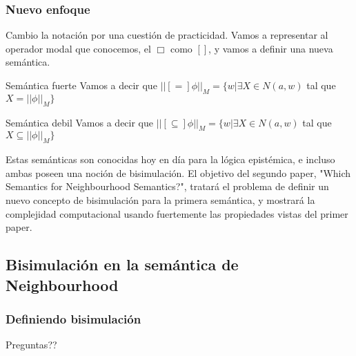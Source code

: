 \documentclass{beamer}
\begin{document}
\begin{frame}
\frametitle{Nuevo enfoque}

Cambio la notaci\'on por una cuesti\'on de practicidad. Vamos a representar al operador modal que conocemos, el $\Box$ como $[]$, y vamos a definir una nueva sem\'antica.

\begin{block}{Sem\'antica fuerte}
Vamos a decir que $||[=]\phi||_{M} = \{w | \exists X \in N(a,w)$ tal que $X = ||\phi||_{M}\}$
\end{block}


\begin{block}{Sem\'antica debil}
Vamos a decir que $||[\subseteq]\phi||_{M} = \{w | \exists X \in N(a,w)$ tal que $X \subseteq ||\phi||_{M}\}$
\end{block}

Estas sem\'anticas son conocidas hoy en d\'ia para la l\'ogica epist\'emica, e incluso ambas poseen una noci\'on de bisimulaci\'on. El objetivo del segundo paper, "Which Semantics for Neighbourhood Semantics?", tratar\'a el problema de definir un nuevo concepto de bisimulaci\'on para la primera sem\'antica, y mostrar\'a la complejidad computacional usando fuertemente las propiedades vistas del primer paper. 
\end{frame}

\subsection{Bisimulaci\'on en la sem\'antica de Neighbourhood}

\begin{frame}
\frametitle{Definiendo bisimulaci\'on}



\end{frame}


\begin{frame}
\Huge{\centerline{Preguntas??}}
\end{frame}

\end{document}
